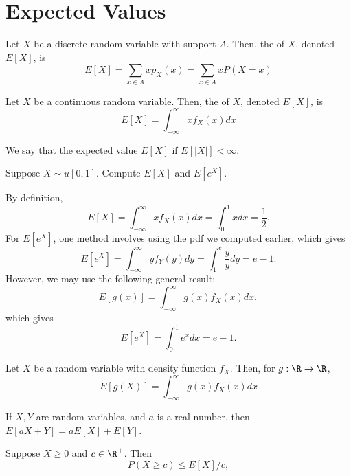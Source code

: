 \documentclass[11pt]{article}
\begin{document}
\section{Expected Values}


\begin{defn}
    Let $X$ be a discrete random variable with support $A$. Then, the  of $X$, denoted $E[X]$, is
        \[
    E[X] = \sum_{x \in A} xp_X(x)=\sum_{x \in A} xP(X=x)
    \]
\end{defn}


\begin{defn}
    Let $X$ be a continuous random variable. Then, the  of $X$, denoted $E[X]$, is
    \[
    E[X] = \int_{-\infty}^\infty xf_X(x) dx
    \]
\end{defn}

\begin{defn}
    We say that the expected value $E[X]$  if $E[|X|]< \infty$.
\end{defn}

\begin{ex}
Suppose $X \sim u[0,1]$. Compute $E[X]$ and $E[e^X]$.
\end{ex}

\begin{solution}
    By definition,
    \[
    E[X] = \int_{-\infty}^\infty xf_X(x)dx = \int_0^1xdx = \frac{1}{2}.
    \]
    For $E[e^X]$, one method involves using the pdf we computed earlier, which gives
    \[
    E[e^X]=\int_{-\infty}^\infty yf_{Y}(y)dy = \int_1^e \frac{y}{y}dy=e-1.
    \]
    However, we may use the following general result:
    \[
    E[g(x)]=\int_{-\infty}^\infty g(x)f_X(x)dx,
    \]
    which gives
    \[
    E[e^X]=\int_{0}^1 e^{x}dx=e-1.
    \]
\end{solution}

\begin{thm}[LOTUS][label=thm:LOTUS]
    Let $X$ be a random variable with density function $f_X$. Then, for $g:\R\to\R$,
    \[
    E[g(X)]=\int_{-\infty}^\infty g(x)f_{X}(x)dx
    \]
\end{thm}

\begin{thm}
    If $X,Y$ are random variables, and $a$ is a real number, then $E[aX+Y]=aE[X]+E[Y]$.
\end{thm}

\begin{thm}
    Suppose $X \geq 0$ and $c \in \R^+$. Then
    \[
    P(X \geq c) \leq E[X]/c,
    \]
\end{thm}
\end{document}
